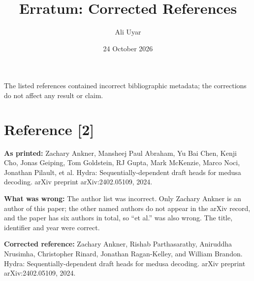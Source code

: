 \documentclass[11pt]{article}
\title{Erratum: Corrected References}
\author{Ali Uyar}
\date{24 October 2026}
\begin{document}
\maketitle
\thispagestyle{empty}

The listed references contained incorrect bibliographic metadata; the corrections do not affect any result or claim.

\section*{Reference [2]}
\noindent\textbf{As printed:} Zachary Ankner, Mansheej Paul Abraham, Yu Bai Chen, Kenji Cho, Jonas Geiping, Tom Goldstein, RJ Gupta, Mark McKenzie, Marco Noci, Jonathan Pilault, et al. Hydra: Sequentially-dependent draft heads for medusa decoding. arXiv preprint arXiv:2402.05109, 2024.

\medskip
\noindent\textbf{What was wrong:} The author list was incorrect. Only Zachary Ankner is an author of this paper; the other named authors do not appear in the arXiv record, and the paper has six authors in total, so ``et al.'' was also wrong. The title, identifier and year were correct.

\medskip
\noindent\textbf{Corrected reference:} Zachary Ankner, Rishab Parthasarathy, Aniruddha Nrusimha, Christopher Rinard, Jonathan Ragan-Kelley, and William Brandon. Hydra: Sequentially-dependent draft heads for medusa decoding. arXiv preprint arXiv:2402.05109, 2024.
\end{document}
